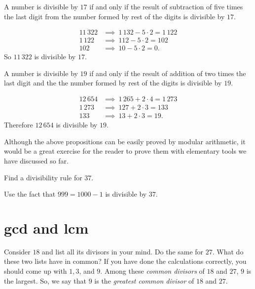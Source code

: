 \documentclass{subfile}
\begin{document}
	\begin{proposition}[Divisibility by $17$]
		A number is divisible by $17$ if and only if the result of subtraction of five times the last digit from the number formed by rest of the digits is divisible by $17$.
	\end{proposition}

	\begin{example}
		\begin{align*}
			11\, 322 & \implies \ 1\, 132 - 5 \cdot 2 = 1\, 122 \\
			1\, 122 & \implies  \ 112 - 5 \cdot 2 =   102 \\
			102 & \implies \ 10 - 5 \cdot 2 =  0.
		\end{align*}
		So $11\, 322$ is divisible by $17$.
	\end{example}

	\begin{proposition}[Divisibility by $19$]
		A number is divisible by $19$ if and only if the result of addition of two times the last digit and the the number formed by rest of the digits is divisible by $19$.
	\end{proposition}

	\begin{example}
		\begin{align*}
			12 \, 654 & \implies \ 1\, 265 + 2 \cdot 4 = 1\, 273 \\
			1\, 273 & \implies  \ 127 + 2 \cdot 3 =   133 \\
			133 & \implies \ 13 + 2 \cdot 3 =  19.
		\end{align*}
		Therefore $12\, 654$ is divisible by $19$.
	\end{example}

	Although the above propositions can be easily proved by modular arithmetic, it would be a great exercise for the reader to prove them with elementary tools we have discussed so far.

	\begin{problem}
		Find a divisibility rule for $37$.
	\end{problem}

	\begin{hint}
		Use the fact that $999=1000-1$ is divisible by $37$.
	\end{hint}

	\section{gcd and lcm}\label{sec:gcd-lcm}
	Consider $18$ and list all its divisors in your mind. Do the same for $27$. What do these two lists have in common? If you have done the calculations correctly, you should come up with $1,3$, and $9$. Among these \textit{common divisors} of $18$ and $27$, $9$ is the largest. So, we say that $9$ is the \textit{greatest common divisor} of $18$ and $27$.
\end{document}
